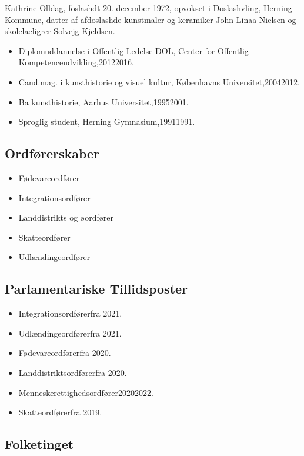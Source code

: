 \documentclass[11pt, a4paper]{awesome-cv}
\begin{document}
\makecvheader[R]
\makelettertitle
\begin{cvletter}
Kathrine Olldag, foslashdt 20. december 1972, opvokset i Doslashvling, Herning Kommune, datter af afdoslashde kunstmaler og keramiker John Linaa Nielsen og skolelaeligrer Solvejg Kjeldsen.

\begin{itemize}
\item Diplomuddannelse i Offentlig Ledelse DOL, Center for Offentlig Kompetenceudvikling,20122016.
\item Cand.mag. i kunsthistorie og visuel kultur, Københavns Universitet,20042012.
\item Ba kunsthistorie, Aarhus Universitet,19952001.
\item Sproglig student, Herning Gymnasium,19911991.
\end{itemize}
\subsection*{Ordførerskaber}
\begin{itemize}
\item Fødevareordfører
\item Integrationsordfører
\item Landdistrikts og øordfører
\item Skatteordfører
\item Udlændingeordfører
\end{itemize}
\subsection*{Parlamentariske Tillidsposter}
\begin{itemize}
\item Integrationsordførerfra 2021.
\item Udlændingeordførerfra 2021.
\item Fødevareordførerfra 2020.
\item Landdistriktsordførerfra 2020.
\item Menneskerettighedsordfører20202022.
\item Skatteordførerfra 2019.
\end{itemize}
\subsection*{Folketinget}

\end{cvletter}
\end{document}
